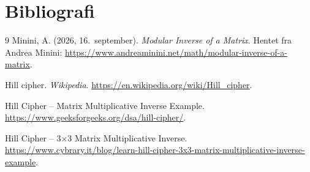 \documentclass[12pt,a4paper]{article}
\begin{document}
\section*{Bibliografi}
\begin{thebibliography}{9}
Minini, A. (2026, 16.~september). \emph{Modular Inverse of a Matrix}. Hentet fra
Andrea Minini: \url{https://www.andreaminini.net/math/modular-inverse-of-a-matrix}.

Hill cipher. \emph{Wikipedia}. \url{https://en.wikipedia.org/wiki/Hill_cipher}.

Hill Cipher – Matrix Multiplicative Inverse Example.
\url{https://www.geeksforgeeks.org/dsa/hill-cipher/}.

Hill Cipher – 3×3 Matrix Multiplicative Inverse.
\url{https://www.cybrary.it/blog/learn-hill-cipher-3x3-matrix-multiplicative-inverse-example}.
\end{thebibliography}
\end{document}
